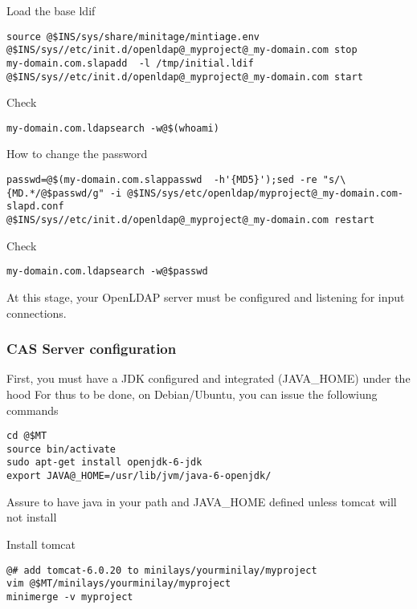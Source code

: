 \documentclass[letterpaper,10pt,english]{sphinxmanual}
\begin{document}
Load the base ldif

\begin{Verbatim}[commandchars=@\[\]]
source @$INS/sys/share/minitage/mintiage.env
@$INS/sys//etc/init.d/openldap@_myproject@_my-domain.com stop
my-domain.com.slapadd  -l /tmp/initial.ldif
@$INS/sys//etc/init.d/openldap@_myproject@_my-domain.com start
\end{Verbatim}

Check

\begin{Verbatim}[commandchars=@\[\]]
my-domain.com.ldapsearch -w@$(whoami)
\end{Verbatim}

How to change the password

\begin{Verbatim}[commandchars=@\[\]]
passwd=@$(my-domain.com.slappasswd  -h'{MD5}');sed -re "s/\{MD.*/@$passwd/g" -i @$INS/sys/etc/openldap/myproject@_my-domain.com-slapd.conf
@$INS/sys//etc/init.d/openldap@_myproject@_my-domain.com restart
\end{Verbatim}

Check

\begin{Verbatim}[commandchars=@\[\]]
my-domain.com.ldapsearch -w@$passwd
\end{Verbatim}

At this stage, your OpenLDAP server must be configured and listening for input connections.


\subsubsection{CAS Server configuration}
\label{usecases/deploying_a_cas_server:cas-server-configuration}
First, you must have a JDK configured and integrated (JAVA\_HOME) under the hood
For thus to be done, on Debian/Ubuntu, you can issue the followiung commands

\begin{Verbatim}[commandchars=@\[\]]
cd @$MT
source bin/activate
sudo apt-get install openjdk-6-jdk
export JAVA@_HOME=/usr/lib/jvm/java-6-openjdk/
\end{Verbatim}

Assure to have java in your path and JAVA\_HOME defined unless tomcat will not install

Install tomcat

\begin{Verbatim}[commandchars=@\[\]]
@# add tomcat-6.0.20 to minilays/yourminilay/myproject
vim @$MT/minilays/yourminilay/myproject
minimerge -v myproject
\end{Verbatim}
\end{document}
